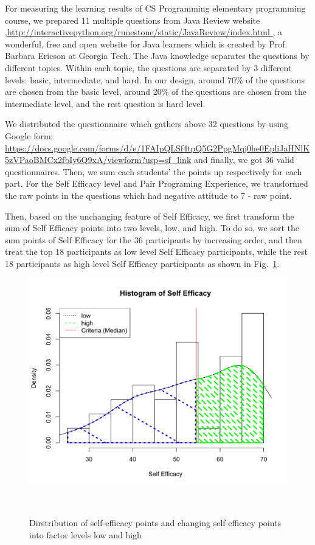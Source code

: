 \documentclass{sigchi}
\begin{document}
For measuring the learning results of CS Programming elementary programming course, we prepared 11 multiple questions from Java Review website ,\url{http://interactivepython.org/runestone/static/JavaReview/index.html }, a wonderful, free and open website for Java learners which is created by Prof. Barbara Ericson at Georgia Tech.  The Java knowledge separates the questions by different topics. Within each topic, the questions are separated by 3 different levels: basic, intermediate, and hard. In our design, around 70\% of the questions are chosen from the basic level, around 20\% of the questions are chosen from the intermediate level, and the rest question is hard level. 

We distributed the questionnaire which gathers above 32  questions by using Google form: 
\url{https://docs.google.com/forms/d/e/1FAIpQLSf4tpQ5G2PpgMqj0he0EpliJaHNlK5zVPaoBMCx2fbIy6Q9xA/viewform?usp=sf_link} and finally, we got 36 valid questionnaires. Then, we sum each  students’ the points up respectively for each part. For the Self Efficacy level  and Pair Programing Experience,  we transformed the raw points in the questions which had negative attitude to 7 - raw point. 

Then, based on the unchanging feature of Self Efficacy, we first transform the sum of Self Efficacy points into two levels, low, and high. To do so, we sort the sum points of Self Efficacy for the 36 participants by increasing order, and then treat the top 18 participants as low level Self Efficacy participants, while the rest 18 participants as high level Self Efficacy participants as shown in Fig.~\ref{fig:figure1}.

\begin{figure}
\centering
  \includegraphics[width=0.9\columnwidth]{figures/hist1}
  \caption{Dirstribution of self-efficacy points and changing self-efficacy points into  factor levels low and high }~\label{fig:figure1}
\end{figure}
\end{document}
